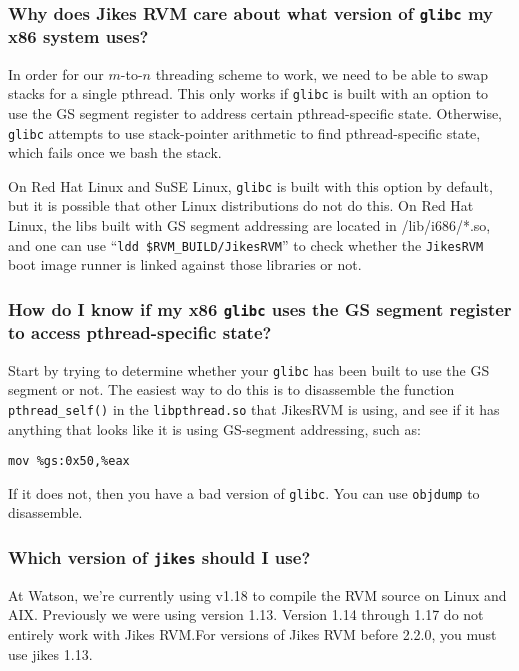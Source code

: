 \subsubsection{Why does Jikes RVM care about what version of \texttt{glibc} my x86 system uses?}

In
order for our $m$-to-$n$ threading scheme to work, we need to be able to swap
stacks for a single pthread.  This only works if \texttt{glibc} is built with an
option to use the GS segment register to address certain pthread-specific
state.  Otherwise, \texttt{glibc} attempts to use stack-pointer
arithmetic to find pthread-specific state, which fails once we bash the stack.

On Red Hat\TMweb{} Linux and SuSE\Rweb{} Linux, \texttt{glibc} is built with this option by
default, but it is possible that other Linux distributions do not do
this.  On Red Hat Linux, the libs built with GS segment addressing are
located in /lib/i686/*.so, and one can use ``\texttt{ldd
  \$RVM\_BUILD/JikesRVM}'' to check whether the \texttt{JikesRVM} boot
image runner is linked against those libraries or not.

\subsubsection{How do I know if my x86 \texttt{glibc} uses the GS
  segment register to access pthread-specific state?}

Start by trying to determine whether your \texttt{glibc} has been
built to use the GS segment 
or not.  The easiest way to do this is to disassemble the function
\texttt{pthread\_self()} in the \texttt{libpthread.so} that JikesRVM is using, and see if it has
anything that looks like it is using GS-segment addressing, such as:
\begin{verbatim}
mov %gs:0x50,%eax
\end{verbatim}
If it does not, then you have a bad version of \texttt{glibc}.   You
can use \texttt{objdump} to disassemble.


\subsubsection{Which version of {\tt jikes} should I use?}
At Watson, we're currently using  v1.18
to compile the RVM source on Linux\Rweb{} and AIX\TMweb. Previously we
were using version 1.13. Version 1.14 through 1.17 do not entirely
work with Jikes RVM.\@  For versions of Jikes RVM before 2.2.0, you must
use jikes 1.13.

